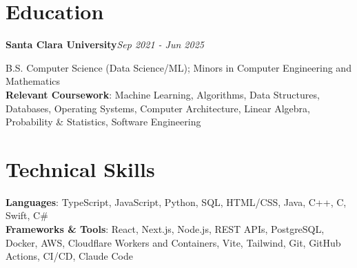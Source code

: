 \documentclass[letterpaper,11pt]{article}
\newcommand{\eduentry}[2]{\textbf{#1}\hfill\textit{#2}\par}
\begin{document}
\section{Education}

\eduentry{Santa Clara University}{Sep 2021 - Jun 2025}
B.S. Computer Science (Data Science/ML); Minors in Computer Engineering and Mathematics\\
\textbf{Relevant Coursework}: Machine Learning, Algorithms, Data Structures, Databases, Operating Systems, Computer Architecture, Linear Algebra, Probability \& Statistics, Software Engineering

\section{Technical Skills}

\textbf{Languages}: TypeScript, JavaScript, Python, SQL, HTML/CSS, Java, C++, C, Swift, C\#\\
\textbf{Frameworks \& Tools}: React, Next.js, Node.js, REST APIs, PostgreSQL, Docker, AWS, Cloudflare Workers and Containers, Vite, Tailwind, Git, GitHub Actions, CI/CD, Claude Code
\end{document}
